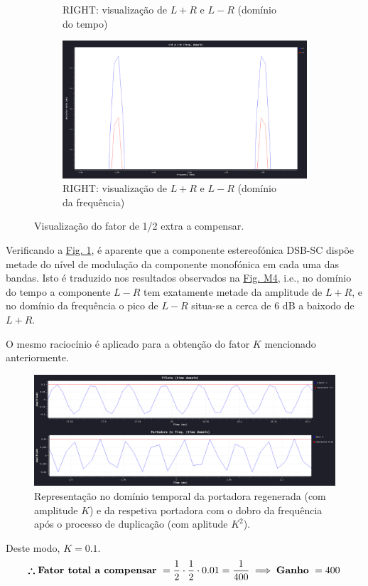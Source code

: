 \begin{figure}[ht]
\begin{subfigure}[b]{0.5\linewidth}
        \caption{RIGHT: visualização de $L+R$ e $L-R$ (domínio \\ do tempo)} 
        \label{fig:ccc} 
    \end{subfigure}%
    \begin{subfigure}[b]{0.5\linewidth}
        \centering
        \includegraphics[width=0.8\linewidth]{img/1_2RIGHTdB.png} 
        \caption{RIGHT: visualização de $L+R$ e $L-R$ (domínio \\ da frequência)} 
        \label{fig:ddd} 
    \end{subfigure} 
    \caption{Visualização do fator de 1/2 extra a compensar.}
    \label{fig:multiplas3}
\end{figure}

Verificando a \hyperref[fig:stereo_spectrum]{Fig. 1}, é aparente que a componente estereofónica DSB-SC dispõe metade do nível de modulação da componente monofónica em cada uma das bandas\cite{transmission_standards_for_fm_sound_broadcasting_at_vhf}. Isto é traduzido nos resultados observados na \hyperref[fig:multiplas3]{Fig. M4}, i.e., no domínio do tempo a componente $L-R$ tem exatamente metade da amplitude de $L+R$, e no domínio da frequência o pico de $L-R$ situa-se a cerca de $6$ dB a baixo\footnotemark[2] do de $L+R$.


O mesmo raciocínio é aplicado para a obtenção do fator $K$ mencionado anteriormente. 

\begin{figure}[H]
    \centering
    \includegraphics[width = 0.6\linewidth]{img/constanteK.png}
    \caption{Representação no domínio temporal da portadora regenerada (com amplitude $K$) e da respetiva portadora com o dobro da frequência após o processo de duplicação (com aplitude $K^2$).}
    \label{fig:constanteK}
\end{figure}
Deste modo, $K = 0.1$.
$$ \pmb{\therefore} \text{\textbf{Fator total a compensar}}\ = \frac{1}{2}\cdot\frac{1}{2}\cdot 0.01 = \frac{1}{400} \implies \text{\textbf{Ganho}}\ = 400$$

